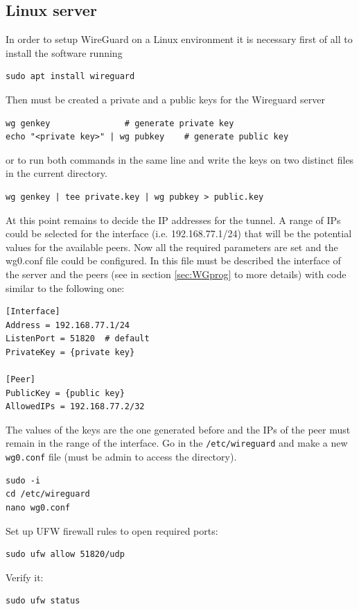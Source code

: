 \subsection{Linux server}
In order to setup WireGuard on a Linux environment it is necessary first of all to install the software running
\begin{lstlisting}
sudo apt install wireguard
\end{lstlisting}
Then must be created a private and a public keys for the Wireguard server 
\begin{lstlisting}
wg genkey               # generate private key
echo "<private key>" | wg pubkey    # generate public key
\end{lstlisting}
or to run both commands in the same line and write the keys on two distinct files in the current directory.
\begin{lstlisting} 
wg genkey | tee private.key | wg pubkey > public.key
\end{lstlisting}
At this point remains to decide the IP addresses for the tunnel. A range of IPs could be selected for the interface (i.e. 192.168.77.1/24) that will be the potential values for the available peers.
Now all the required parameters are set and the wg0.conf file could be configured. In this file must be described the interface of the server and the peers (see in section \ref{sec:WGprog} to more details) with code similar to the following one:
\begin{lstlisting}
[Interface]
Address = 192.168.77.1/24
ListenPort = 51820  # default
PrivateKey = {private key}

[Peer]
PublicKey = {public key}
AllowedIPs = 192.168.77.2/32
\end{lstlisting}
The values of the keys are the one generated before and the IPs of the peer must remain in the range of the interface.
Go in the \texttt{/etc/wireguard} and make a new \texttt{wg0.conf} file (must be admin to access the directory).

\begin{lstlisting}
sudo -i
cd /etc/wireguard
nano wg0.conf
\end{lstlisting}

Set up UFW firewall rules to open required ports:

\begin{lstlisting}
sudo ufw allow 51820/udp
\end{lstlisting}

Verify it:

\begin{lstlisting}
sudo ufw status
\end{lstlisting}

